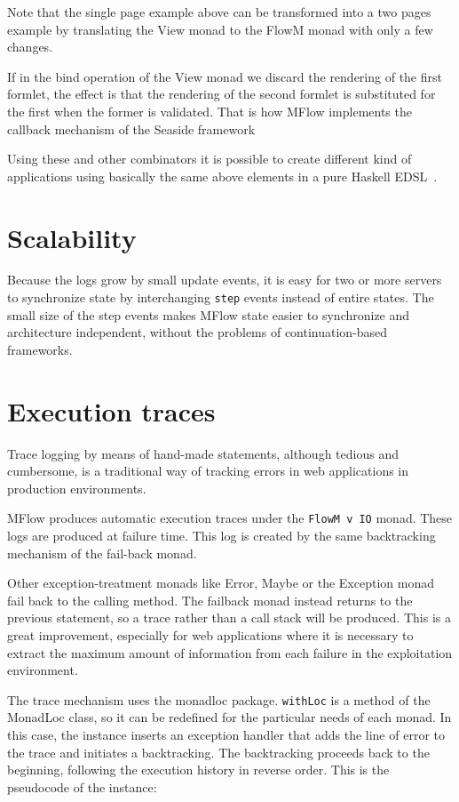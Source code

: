 \documentclass{tmr}
\begin{document}
Note that the single page example above can be transformed into a two pages example by translating the View monad to the FlowM monad with only a few changes. 
 
If in the bind operation of the View monad we discard the rendering of the first formlet, the effect is that the rendering of the second formlet is substituted for the first when the former is validated. That is how MFlow implements the callback mechanism of the Seaside framework~\cite{auth:seasidecallback}

Using these and other combinators it is possible to create different kind of applications using basically the same above elements in a pure Haskell EDSL~\cite{auth:mflowdsl}.
 
\section{Scalability} 
 
Because the logs grow by small update events, it is easy for two or more servers to synchronize state by interchanging {\tt step} events instead of entire states. The small size of the step events  makes MFlow state easier to synchronize and architecture independent, without the problems of continuation-based frameworks. 
 
\section{Execution traces} 
 
Trace logging by means of hand-made statements, although tedious and cumbersome, is a traditional way of tracking errors in web applications in production environments.
 
MFlow produces automatic execution traces under the {\tt FlowM v IO} 
monad. These logs are produced at failure time. This log is created by the same backtracking mechanism of the fail-back monad.

Other exception-treatment monads like Error, Maybe or the Exception monad  fail back to the calling method. The failback monad instead returns to the previous statement, so  a trace rather than a call stack will be produced. This is a great improvement, especially for web applications where it is necessary to extract the maximum amount of information from each failure in the exploitation environment. 

The trace mechanism uses the monadloc\cite{auth:monadloc} package. {\tt withLoc} is a method of the MonadLoc class, so it can be redefined for the particular needs of each monad. In this case, the instance inserts an exception handler that adds the line of error to the trace and initiates a backtracking. The backtracking proceeds back to the beginning, following the execution history in reverse order.  This is the pseudocode of the instance: 
 
\end{document}

